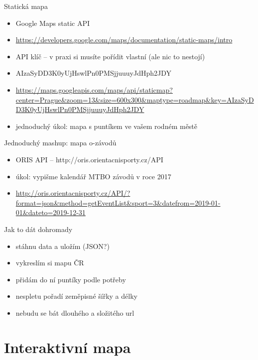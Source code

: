 \documentclass{beamer}
\begin{document}
\begin{frame}{Statická mapa}
  \begin{itemize}
    \item Google Maps static API
    \item {\tiny \url{https://developers.google.com/maps/documentation/static-maps/intro}}
    \item API klíč -- v praxi si musíte pořídit vlastní (ale nic to nestojí)
    \item AIzaSyDD3K0yUjHswlPn0PMSjjuuuyJdHph2JDY
    \item  {\tiny \url{https://maps.googleapis.com/maps/api/staticmap?center=Prague\&zoom=13\&size=600x300\&maptype=roadmap\&key=AIzaSyDD3K0yUjHswlPn0PMSjjuuuyJdHph2JDY}}
    \item jednoduchý úkol: mapa s puntíkem ve vašem rodném městě
  \end{itemize}
\end{frame}

\begin{frame}{Jednoduchý mashup: mapa o-závodů}
  \begin{itemize}
    \item ORIS API -- http://oris.orientacnisporty.cz/API
    \item úkol: vypišme kalendář MTBO závodů v roce 2017
    \item {\tiny \url{http://oris.orientacnisporty.cz/API/?format=json\&method=getEventList\&sport=3\&datefrom=2019-01-01\&dateto=2019-12-31}}
  \end{itemize}
\end{frame}


\begin{frame}{Jak to dát dohromady}
  \begin{itemize}
    \item stáhnu data a uložím (JSON?)
    \item vykreslím si mapu ČR
    \item přidám do ní puntíky podle potřeby
    \item nespletu pořadí zeměpisné šířky a délky
    \item nebudu se bát dlouhého a složitého url
  \end{itemize}
\end{frame}

\section{Interaktivní mapa}
\end{document}
